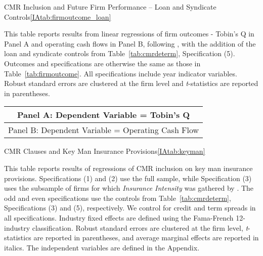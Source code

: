\documentclass[12pt]{article}
\begin{document}
\begin{appendices}
\begin{singlespace}
\begin{landscapepapertable}{CMR Inclusion and Future Firm Performance -- Loan and Syndicate Controls}{\ref{IAtab:firmoutcome_loan}}{\skipline}
  \label{IAtab:firmoutcome_loan}

  This table reports results from linear regressions of firm outcomes - Tobin's Q in Panel A and operating cash flows in Panel B, following \cite{Nini_2009}, with the addition of the loan and syndicate controls from Table~\ref{tab:cmrdeterm}, Specification (5).
  Outcomes and specifications are otherwise the same as those in Table~\ref{tab:firmoutcome}.
  All specifications include year indicator variables.
  Robust standard errors are clustered at the firm level and \textit{t}-statistics are reported in parentheses.
  \postamble

    \def\arraystretch{.92}
  \startdata
    \begin{tabular}{l*{10}{c}}
        \toprule
        \multicolumn{11}{c}{\small  {Panel A}: Dependent Variable = Tobin's Q} \\ \midrule
        
        \midrule
        \multicolumn{11}{c}{\small  {Panel B}: Dependent Variable = Operating Cash Flow} \\ \midrule
        
        \bottomrule
    \end{tabular}
\end{landscapepapertable}



\begin{papertable}{CMR Clauses and Key Man Insurance Provisions}{\ref{IAtab:keyman}}{}
  \label{IAtab:keyman}

  This table reports results of regressions of CMR inclusion on key man insurance provisions.
  Specifications (1) and (2) use the full sample, while Specification (3) uses the subsample of firms for which \textit{Insurance Intensity} was gathered by \cite{Israelsen_2017}.
  The odd and even specifications use the controls from Table~\ref{tab:cmrdeterm}, Specifications (3) and (5), respectively.
  We control for credit and term spreads in all specifications.
  Industry fixed effects are defined using the Fama-French 12-industry classification.
  Robust standard errors are clustered at the firm level, \textit{t}-statistics are reported in parentheses, and average marginal effects are reported in italics.
  The independent variables are defined in the Appendix.
  \postamblesig


\end{papertable}
\end{singlespace}
\end{appendices}
\end{document}

